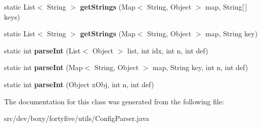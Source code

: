 \begin{DoxyCompactItemize}
\item 
\hypertarget{classdev_1_1boxy_1_1fortyfive_1_1utils_1_1_config_parser_a8636cf82d27b7493ef7dc6aaf419e90a}{
static List$<$ String $>$ {\bfseries getStrings} (Map$<$ String, Object $>$ map, String\mbox{[}$\,$\mbox{]} keys)}
\label{db/d92/classdev_1_1boxy_1_1fortyfive_1_1utils_1_1_config_parser_a8636cf82d27b7493ef7dc6aaf419e90a}

\item 
\hypertarget{classdev_1_1boxy_1_1fortyfive_1_1utils_1_1_config_parser_acd5d2ff8b7888e88587589348e6923bd}{
static List$<$ String $>$ {\bfseries getStrings} (Map$<$ String, Object $>$ map, String key)}
\label{db/d92/classdev_1_1boxy_1_1fortyfive_1_1utils_1_1_config_parser_acd5d2ff8b7888e88587589348e6923bd}

\item 
\hypertarget{classdev_1_1boxy_1_1fortyfive_1_1utils_1_1_config_parser_a1804211f79b4d04957c2e93ea652896d}{
static int {\bfseries parseInt} (List$<$ Object $>$ list, int idx, int n, int def)}
\label{db/d92/classdev_1_1boxy_1_1fortyfive_1_1utils_1_1_config_parser_a1804211f79b4d04957c2e93ea652896d}

\item 
\hypertarget{classdev_1_1boxy_1_1fortyfive_1_1utils_1_1_config_parser_ab2f1feffd85b589217b1e16130485901}{
static int {\bfseries parseInt} (Map$<$ String, Object $>$ map, String key, int n, int def)}
\label{db/d92/classdev_1_1boxy_1_1fortyfive_1_1utils_1_1_config_parser_ab2f1feffd85b589217b1e16130485901}

\item 
\hypertarget{classdev_1_1boxy_1_1fortyfive_1_1utils_1_1_config_parser_ae20cb28b2bf3180ee8aa20ae1d38be85}{
static int {\bfseries parseInt} (Object xObj, int n, int def)}
\label{db/d92/classdev_1_1boxy_1_1fortyfive_1_1utils_1_1_config_parser_ae20cb28b2bf3180ee8aa20ae1d38be85}

\end{DoxyCompactItemize}


The documentation for this class was generated from the following file:\begin{DoxyCompactItemize}
\item 
src/dev/boxy/fortyfive/utils/ConfigParser.java\end{DoxyCompactItemize}
